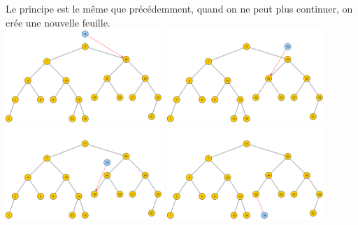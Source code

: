 \documentclass[10pt,firamath,cours]{nsi}
\begin{document}
\begin{methode}
    Le principe est le même que précédemment, quand on ne peut plus continuer, on crée une nouvelle feuille.\\
    \includegraphics[width=6cm]{img/ajout/ajout1} \hspace{2em}
    \includegraphics[width=6cm]{img/ajout/ajout2}\\ 
    \includegraphics[width=6cm]{img/ajout/ajout3} \hspace{2em}
    \includegraphics[width=6cm]{img/ajout/ajout4}  
\end{methode}
\end{document}
